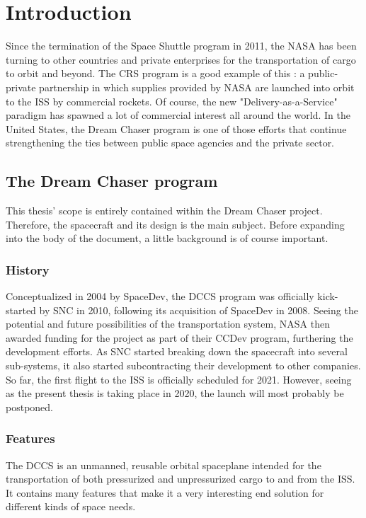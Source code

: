 \setlength{\parindent}{2em}
\chapter{Introduction}\label{cha:intro}
Since the termination of the Space Shuttle program in 2011, the \gls{NASA} has been turning to other countries and private enterprises for the transportation of cargo to orbit and beyond. The \gls{CRS} program is a good example of this : a public-private partnership in which supplies provided by NASA are launched into orbit to the \gls{ISS} by commercial rockets. Of course, the new "Delivery-as-a-Service" paradigm has spawned a lot of commercial interest all around the world. In the United States, the Dream Chaser program is one of those efforts that continue strengthening the ties between public space agencies and the private sector.

\section{The Dream Chaser program}
This thesis' scope is entirely contained within the Dream Chaser project. Therefore, the spacecraft and its design is the main subject. Before expanding into the body of the document, a little background is of course important.
\subsection{History}
Conceptualized in 2004 by SpaceDev, the \gls{DCCS} program was officially kick-started by \gls{SNC} in 2010, following its acquisition of SpaceDev in 2008\cite{online:fikes}. Seeing the potential and future possibilities of the transportation system, NASA then awarded funding for the project as part of their \gls{CCDev} program, furthering the development efforts. As \gls{SNC} started breaking down the spacecraft into several sub-systems, it also started subcontracting their development to other companies. So far, the first flight to the \gls{ISS} is officially scheduled for 2021. However, seeing as the present thesis is taking place in 2020, the launch will most probably be postponed.

\subsection{Features}
The \gls{DCCS} is an unmanned, reusable orbital spaceplane intended for the transportation of both pressurized and unpressurized cargo to and from the \gls{ISS}. It contains many features that make it a very interesting end solution for different kinds of space needs. 

